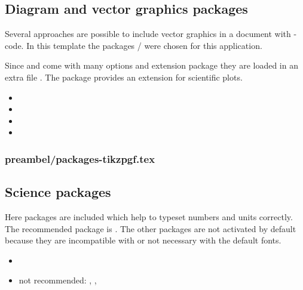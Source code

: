 
\subsection{Diagram and vector graphics packages}
Several approaches are possible to include vector graphics in a \latex document with \latex-code. In this template the packages / were chosen for this application.

Since  and  come with many options and extension package they are loaded in an extra file . The package  provides an extension for scientific plots.

\begin{itemize}[noitemsep]
\item {}
\item {}
\item {}
\item {}
\end{itemize}



\subsubsection{preambel/packages-tikzpgf.tex}


\subsection{Science packages}
Here packages are included which help to typeset numbers and units correctly.
The recommended package is . The other packages are not activated by default because they are incompatible with  or not necessary with the default fonts.

\begin{itemize}[noitemsep]
\item {}
\item not recommended: , ,  
\end{itemize}

